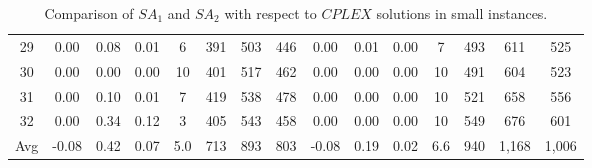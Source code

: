 \documentclass[11pt]{article}
\begin{document}
\begin{table}[H]
\begin{tabular}{ccccccccccccccc}
\multicolumn{1}{c|}{29} & 0.00 & 0.08 & \multicolumn{1}{c|}{0.01} & \multicolumn{1}{c|}{6} & 391 & 503 & \multicolumn{1}{c|}{446} & 0.00 & 0.01 & \multicolumn{1}{c|}{0.00} & \multicolumn{1}{c|}{7} & 493 & 611 & 525 \\
\multicolumn{1}{c|}{30} & 0.00 & 0.00 & \multicolumn{1}{c|}{0.00} & \multicolumn{1}{c|}{10} & 401 & 517 & \multicolumn{1}{c|}{462} & 0.00 & 0.00 & \multicolumn{1}{c|}{0.00} & \multicolumn{1}{c|}{10} & 491 & 604 & 523 \\
\multicolumn{1}{c|}{31} & 0.00 & 0.10 & \multicolumn{1}{c|}{0.01} & \multicolumn{1}{c|}{7} & 419 & 538 & \multicolumn{1}{c|}{478} & 0.00 & 0.00 & \multicolumn{1}{c|}{0.00} & \multicolumn{1}{c|}{10} & 521 & 658 & 556 \\
\multicolumn{1}{c|}{32} & 0.00 & 0.34 & \multicolumn{1}{c|}{0.12} & \multicolumn{1}{c|}{3} & 405 & 543 & \multicolumn{1}{c|}{458} & 0.00 & 0.00 & \multicolumn{1}{c|}{0.00} & \multicolumn{1}{c|}{10} & 549 & 676 & 601 \\ \hline\hline 
\multicolumn{1}{c|}{Avg} & \multicolumn{1}{c}{-0.08} & \multicolumn{1}{c}{0.42} & \multicolumn{1}{c|}{0.07} & \multicolumn{1}{c|}{5.0} & \multicolumn{1}{c}{713} & \multicolumn{1}{c}{893} & \multicolumn{1}{c|}{803} & \multicolumn{1}{c}{-0.08} & \multicolumn{1}{c}{0.19} & \multicolumn{1}{c|}{0.02} & \multicolumn{1}{c|}{6.6} & \multicolumn{1}{c}{940} & \multicolumn{1}{c}{1,168} & \multicolumn{1}{c}{1,006} \\\bottomrule
\end{tabular}
\caption{Comparison of $SA_{1}$ and $SA_{2}$ with respect to $CPLEX$ solutions in small instances.}
	\label{sa_comparison}%
\end{table}
\end{document}
